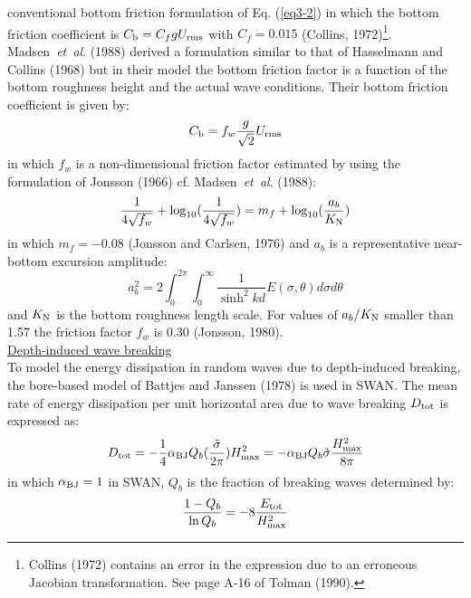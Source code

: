 \documentclass[12pt]{book}
\begin{document}
conventional bottom friction formulation of Eq. (\ref{eq3-2}) in which the bottom friction coefficient is
$C_{\rm b} = C_f g U_{\rm rms}$ with $C_f = 0.015$ (Collins, 1972)\footnote{Collins (1972) contains
an error in the expression due to an erroneous Jacobian transformation. See page A-16 of Tolman (1990).}.
\\[2ex]
\noindent
Madsen~{\it et~al}. (1988) derived a formulation similar to that of Hasselmann and Collins (1968) but in their
model the bottom friction factor is a function of the bottom roughness height and the actual wave
conditions. Their bottom friction coefficient is given by:
\begin{equation}
  C_{\rm b} = f_w \frac{g}{\sqrt{2}} U_{\rm rms}
  \label{eq3-19}
\end{equation}
in which $f_w$ is a non-dimensional friction factor estimated by using the formulation of Jonsson (1966) cf.
Madsen~{\it et~al}. (1988):
\begin{equation}
  \frac{1}{4\sqrt{f_w}} + \log_{10} (\frac{1}{4\sqrt{f_w}}) = m_f + \log_{10} (\frac{a_b}{K_{\rm N}})
  \label{eq3-20}
\end{equation}
in which $m_f = -0.08$ (Jonsson and Carlsen, 1976) and $a_b$ is a representative near-bottom excursion
amplitude:
\begin{equation}
  a^2_{b} = 2\int_{0}^{2\pi} \int_{0}^{\infty} \frac{1}{\sinh^2 kd} E(\sigma,\theta) d\sigma d\theta
  \label{eq3-21}
\end{equation}
and $K_{\rm N}$ is the bottom roughness length scale. For values of $a_b/K_{\rm N}$ smaller than 1.57 the
friction factor $f_w$ is 0.30 (Jonsson, 1980).
\nocite{Jon76C,Jon80}
\\[2ex]
\noindent
\underline{Depth-induced wave breaking}\\[2ex]
To model the energy dissipation in random waves due to depth-induced breaking, the bore-based model
of Battjes and Janssen (1978) is used in SWAN. The mean rate of energy dissipation per unit horizontal
area due to wave breaking $D_{\rm tot}$ is expressed as:
\begin{equation}
  D_{\rm tot} = - \frac{1}{4} \alpha_{\rm BJ} Q_b (\frac{\tilde{\sigma}}{2\pi}) H^2_{\rm max}
              = - \alpha_{\rm BJ} Q_b \tilde{\sigma} \frac{H^2_{\rm max}}{8\pi}
  \label{eq3-22}
\end{equation}
in which $\alpha_{\rm BJ} = 1$ in SWAN, $Q_b$ is the fraction of breaking waves determined by:
\begin{equation}
  \frac{1 - Q_b}{\ln Q_b} = -8 \frac{E_{\rm tot}}{H_{\rm max}^2}
  \label{eq3-23}
\end{equation}
\end{document}

